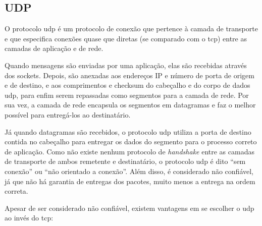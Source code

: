 
\newpage
\subsection*{UDP}

O protocolo \gls*{udp} é um protocolo de conexão que pertence à camada de transporte e
que especifica conexões quase que diretas (se comparado com o \gls*{tcp}) entre as
camadas de aplicação e de rede.

Quando mensagens são enviadas por uma aplicação, elas são recebidas através dos
\glspl*{socket}. Depois, são anexadas aos endereços IP e número de porta de origem e de
destino, e aos comprimentos e \gls{checksum} do cabeçalho e do corpo de dados
\gls*{udp}, para enfim serem repassadas como segmentos para a camada de rede. Por sua
vez, a camada de rede encapsula os segmentos em datagramas e faz o melhor possível para
entregá-los ao destinatário.

Já quando datagramas são recebidos, o protocolo \gls*{udp} utiliza a porta de destino
contida no cabeçalho para entregar os dados do segmento para o processo correto de
aplicação. Como não existe nenhum protocolo de \emph{handshake} entre as camadas de
transporte de ambos remetente e destinatário, o protocolo \gls*{udp} é dito ``sem
conexão'' ou ``não orientado a conexão''. Além disso, é considerado não confiável, já
que não há garantia de entregas dos pacotes, muito menos a entrega na ordem correta.

Apesar de ser considerado não confiável, existem vantagens em se escolher o \gls*{udp}
ao invés do \gls*{tcp}:

